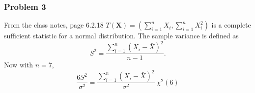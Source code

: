 \documentclass{article}
\begin{document}
\subsubsection*{Problem 3}
From the class notes, page 6.2.18 $T(\mathbf{X}) = (\sum_{i=1}^nX_i, \sum_{i=1}^nX_i^2)$ is a complete sufficient statistic for a normal distribution. The sample variance is defined as \[S^2=\frac{\sum_{i=1}^n\left(X_i-\bar{X}\right)^2}{n-1}.\] Now with $n=7$, \[\frac{6S^2}{\sigma^2} = \frac{\sum_{i=1}^n\left(X_i-\bar{X}\right)^2}{\sigma^2} ~ \chi^2(6)\] 
\end{document}
